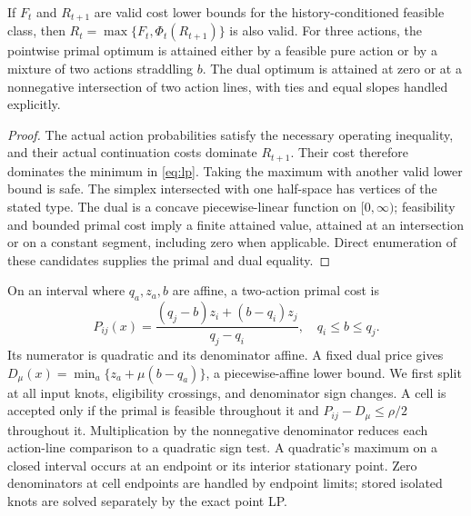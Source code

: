 \begin{proposition}\label{prop:restart}
If $F_t$ and $R_{t+1}$ are valid cost lower bounds for the history-conditioned feasible class, then $R_t=\max\{F_t,\Phi_t(R_{t+1})\}$ is also valid. For three actions, the pointwise primal optimum is attained either by a feasible pure action or by a mixture of two actions straddling $b$. The dual optimum is attained at zero or at a nonnegative intersection of two action lines, with ties and equal slopes handled explicitly.
\end{proposition}
\begin{proof}
The actual action probabilities satisfy the necessary operating inequality, and their actual continuation costs dominate $R_{t+1}$. Their cost therefore dominates the minimum in \eqref{eq:lp}. Taking the maximum with another valid lower bound is safe. The simplex intersected with one half-space has vertices of the stated type. The dual is a concave piecewise-linear function on $[0,\infty)$; feasibility and bounded primal cost imply a finite attained value, attained at an intersection or on a constant segment, including zero when applicable. Direct enumeration of these candidates supplies the primal and dual equality.\end{proof}

On an interval where $q_a,z_a,b$ are affine, a two-action primal cost is
\begin{equation}\label{eq:rational}
 P_{ij}(x)=\frac{(q_j-b)z_i+(b-q_i)z_j}{q_j-q_i},\quad q_i\leq b\leq q_j.
\end{equation}
Its numerator is quadratic and its denominator affine. A fixed dual price gives $D_\mu(x)=\min_a\{z_a+\mu(b-q_a)\}$, a piecewise-affine lower bound. We first split at all input knots, eligibility crossings, and denominator sign changes. A cell is accepted only if the primal is feasible throughout it and $P_{ij}-D_\mu\leq\rho/2$ throughout it. Multiplication by the nonnegative denominator reduces each action-line comparison to a quadratic sign test. A quadratic's maximum on a closed interval occurs at an endpoint or its interior stationary point. Zero denominators at cell endpoints are handled by endpoint limits; stored isolated knots are solved separately by the exact point LP.

